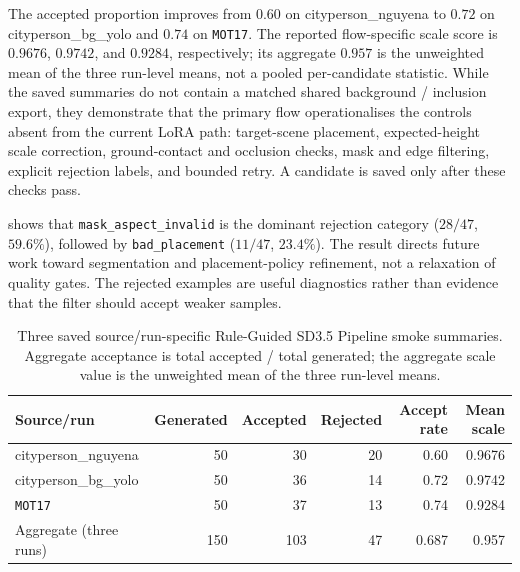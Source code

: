 \documentclass[11pt,a4paper]{article}
\newcommand{\rgp}{Rule-Guided SD3.5 Pipeline\xspace}  %
\begin{document}
The accepted proportion improves from $0.60$ on cityperson\allowbreak\_nguyena to
$0.72$ on cityperson\allowbreak\_bg\allowbreak\_yolo and $0.74$ on \texttt{MOT17}. The
reported flow-specific scale score is $0.9676$, $0.9742$, and $0.9284$,
respectively; its aggregate $0.957$ is the unweighted mean of the three run-level
means, not a pooled per-candidate statistic. While the saved summaries do not
contain a matched shared background / inclusion export, they demonstrate that the primary
flow operationalises the controls absent from the current LoRA path: target-scene placement, expected-height scale correction, ground-contact and occlusion checks, mask and edge filtering, explicit rejection labels, and bounded retry. A candidate is saved only after these checks pass.

 shows that \texttt{mask\_aspect\_invalid} is the dominant
rejection category ($28/47$, $59.6\%$), followed by \texttt{bad\_placement}
($11/47$, $23.4\%$). The result directs future work toward segmentation and
placement-policy refinement, not a relaxation of quality gates. The rejected
examples are useful diagnostics rather than evidence that the filter should accept
weaker samples.

\begin{table}[t]
  \centering
  \caption[Rule-guided primary-flow diagnostics]{Three saved source/run-specific
  \rgp smoke summaries. Aggregate acceptance is total accepted / total generated;
  the aggregate scale value is the unweighted mean of the three run-level means.}
  \label{tab:v5summary}
  \scriptsize
  \begin{tabular}{@{}lrrrrr@{}}
    \toprule
    Source/run & Generated & Accepted & Rejected & Accept rate & Mean scale \\
    \midrule
    cityperson\allowbreak\_nguyena & 50 & 30 & 20 & 0.60 & 0.9676 \\
    cityperson\allowbreak\_bg\allowbreak\_yolo & 50 & 36 & 14 & 0.72 & 0.9742 \\
    \texttt{MOT17} & 50 & 37 & 13 & 0.74 & 0.9284 \\
    \midrule
    Aggregate (three runs) & 150 & 103 & 47 & 0.687 & 0.957 \\
    \bottomrule
  \end{tabular}
\end{table}
\end{document}
